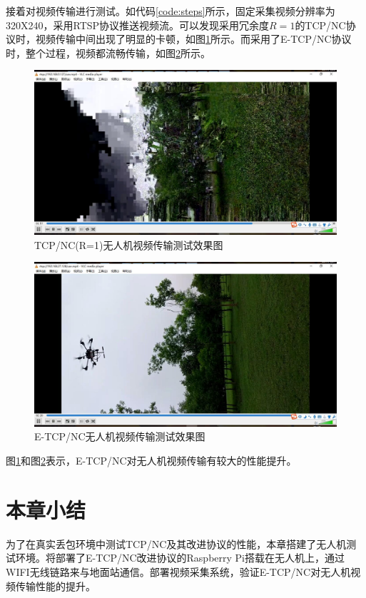 \par
接着对视频传输进行测试。如代码\ref{code:steps}所示，固定采集视频分辨率为320X240，采用RTSP协议推送视频流。可以发现采用冗余度$R=1$的TCP/NC协议时，视频传输中间出现了明显的卡顿，如图\ref{fig:feiji1}所示。而采用了E-TCP/NC协议时，整个过程，视频都流畅传输，如图\ref{fig:feiji2}所示。
\begin{figure}[htbp]
	\centering
	\includegraphics[width=6in]{figures/2.jpg}
	\caption{TCP/NC(R=1)无人机视频传输测试效果图}
	\label{fig:feiji1}
\end{figure}

\begin{figure}[htbp]
	\centering
	\includegraphics[width=6in]{figures/3.jpg}
	\caption{E-TCP/NC无人机视频传输测试效果图}
	\label{fig:feiji2}
\end{figure}
\par
图\ref{fig:feiji1}和图\ref{fig:feiji2}表示，E-TCP/NC对无人机视频传输有较大的性能提升。
\section{本章小结}
为了在真实丢包环境中测试TCP/NC及其改进协议的性能，本章搭建了无人机测试环境。将部署了E-TCP/NC改进协议的Raspberry Pi搭载在无人机上，通过WIFI无线链路来与地面站通信。部署视频采集系统，验证E-TCP/NC对无人机视频传输性能的提升。